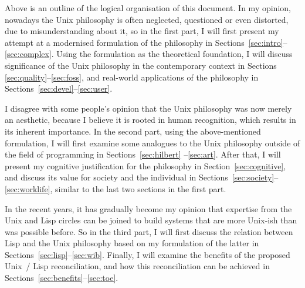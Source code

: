 \documentclass{article}
\begin{document}
\begin{wquoting}
\end{wquoting}

Above is an outline of the logical organisation of this document.  In my
opinion, nowadays the Unix philosophy is often neglected, questioned or
even distorted, due to misunderstanding about it, so in the first part,
I will first present my attempt at a modernised formulation of the
philosophy in Sections~\ref{sec:intro}--\ref{sec:complex}.  Using the
formulation as the theoretical foundation, I will discuss significance
of the Unix philosophy in the contemporary context in Sections~%
\ref{sec:quality}--\ref{sec:foss}, and real-world applications
of the philosophy in Sections~\ref{sec:devel}--\ref{sec:user}.

I disagree with some people's opinion that the Unix philosophy was now
merely an aesthetic, because I believe it is rooted in human recognition,
which results in its inherent importance.  In the second part, using the
above-mentioned formulation, I will first examine some analogues to the Unix
philosophy outside of the field of programming in Sections~\ref{sec:hilbert}%
--\ref{sec:art}.  After that, I will present my cognitive justification
for the philosophy in Section~\ref{sec:cognitive}, and discuss its
value for society and the individual in Sections~\ref{sec:society}--%
\ref{sec:worklife}, similar to the last two sections in the first part.

In the recent years, it has gradually become my opinion that expertise from
the Unix and Lisp circles can be joined to build systems that are more
Unix-ish than was possible before.  So in the third part, I will first discuss
the relation between Lisp and the Unix philosophy based on my formulation
of the latter in Sections~\ref{sec:lisp}--\ref{sec:wib}.  Finally, I will
examine the benefits of the proposed Unix~/ Lisp reconciliation, and how this
reconciliation can be achieved in Sections~\ref{sec:benefits}--\ref{sec:toe}.
\end{document}
